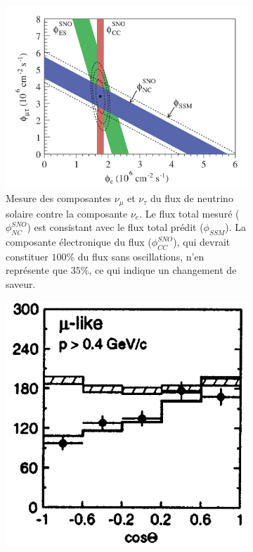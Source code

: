             \begin{figure}[htbp]
                \begin{subfigure}[t]{0.56\textwidth}
                    \includegraphics[width=\textwidth]{Chapitre_1/pictures/SNO_plot.png}
                    \caption{Mesure des composantes $\nu_{\mu}$ et $\nu_{\tau}$ du flux de neutrino solaire contre la composante $\nu_e$\cite{Aharmim2013}. Le flux total mesuré ($\phi_{NC}^{SNO}$) est consistant avec le flux total prédit ($\phi_{SSM}$). La composante électronique du flux ($\phi_{CC}^{SNO}$), qui devrait constituer $100\%$ du flux sans oscillations, n'en représente que $35\%$, ce qui indique un changement de saveur.}
                    \label{fig::SNO_plot}
                \end{subfigure}
                \hfill 
                \begin{subfigure}[t]{0.4\textwidth}
                    \includegraphics[width=\textwidth]{Chapitre_1/pictures/superK_plot.png}

\end{subfigure}
\end{figure}
